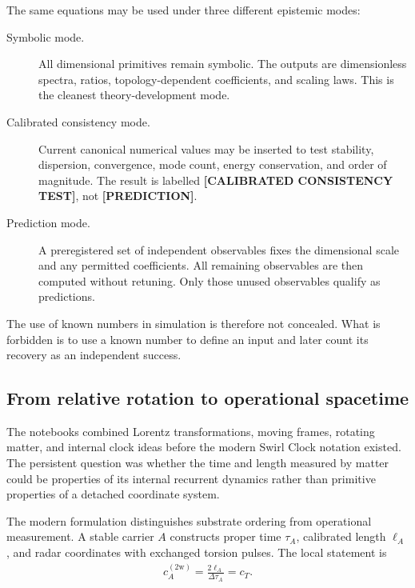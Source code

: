 \documentclass[11pt]{article}
\theoremstyle{definition}
\theoremstyle{plain}
\theoremstyle{remark}
\begin{document}
The same equations may be used under three different epistemic modes:
\begin{description}
    \item[Symbolic mode.] All dimensional primitives remain symbolic. The
    outputs are dimensionless spectra, ratios, topology-dependent coefficients,
    and scaling laws. This is the cleanest theory-development mode.

    \item[Calibrated consistency mode.] Current canonical numerical values may
    be inserted to test stability, dispersion, convergence, mode count, energy
    conservation, and order of magnitude. The result is labelled
    \textbf{[CALIBRATED CONSISTENCY TEST]}, not \textbf{[PREDICTION]}.

    \item[Prediction mode.] A preregistered set of independent observables fixes
    the dimensional scale and any permitted coefficients. All remaining
    observables are then computed without retuning. Only those unused
    observables qualify as predictions.
\end{description}

The use of known numbers in simulation is therefore not concealed. What is
forbidden is to use a known number to define an input and later count its
recovery as an independent success.

\subsection{From relative rotation to operational spacetime}
\label{subsec:relative_rotation_operational_spacetime_genesis}

The notebooks combined Lorentz transformations, moving frames, rotating matter,
and internal clock ideas before the modern Swirl Clock notation existed. The
persistent question was whether the time and length measured by matter could be
properties of its internal recurrent dynamics rather than primitive properties
of a detached coordinate system.

The modern formulation distinguishes substrate ordering from operational
measurement. A stable carrier $A$ constructs proper time $\tau_A$, calibrated
length $\ell_A$, and radar coordinates with exchanged torsion pulses. The local
statement is
\begin{align}
    c_A^{(2\mathrm w)}
    =
    \frac{2\ell_A}{\Delta\tau_A}
    =
    c_T.
    \label{eq:genesis_local_radar_speed}
\end{align}
\end{document}
